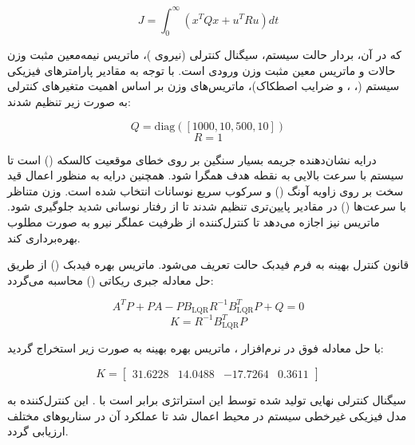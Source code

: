 \begin{equation}
    J = \int_{0}^{\infty} \left( x^T Q x + u^T R u \right) dt
\end{equation}

که در آن،  بردار حالت سیستم،  سیگنال کنترلی (نیروی )،  ماتریس نیمه‌معین مثبت وزن حالات و  ماتریس معین مثبت وزن ورودی است. با توجه به مقادیر پارامترهای فیزیکی سیستم (، ،  و ضرایب اصطکاک)، ماتریس‌های وزن بر اساس اهمیت متغیرهای کنترلی به صورت زیر تنظیم شدند:

\begin{equation}
    Q = \mathrm{diag}([1000, 10, 500, 10])
\end{equation}
\begin{equation}
    R = 1
\end{equation}

درایه  نشان‌دهنده جریمه بسیار سنگین بر روی خطای موقعیت کالسکه () است تا سیستم با سرعت بالایی به نقطه هدف همگرا شود. همچنین درایه  به منظور اعمال قید سخت بر روی زاویه آونگ (\lr{$\theta$}) و سرکوب سریع نوسانات انتخاب شده است. وزن متناظر با سرعت‌ها () در مقادیر پایین‌تری تنظیم شدند تا از رفتار نوسانی شدید جلوگیری شود. ماتریس  نیز اجازه می‌دهد تا کنترل‌کننده از ظرفیت عملگر نیرو به صورت مطلوب بهره‌برداری کند.

قانون کنترل بهینه به فرم فیدبک حالت  تعریف می‌شود. ماتریس بهره فیدبک () از طریق حل معادله جبری ریکاتی () محاسبه می‌گردد:

\begin{equation}
    A^T P + P A - P B_{\mathrm{LQR}} R^{-1} B_{\mathrm{LQR}}^T P + Q = 0
\end{equation}
\begin{equation}
    K = R^{-1} B_{\mathrm{LQR}}^T P
\end{equation}

با حل معادله فوق در نرم‌افزار ، ماتریس بهره بهینه  به صورت زیر استخراج گردید:

\begin{equation}
    K = \begin{bmatrix} 31.6228 & 14.0488 & -17.7264 & 0.3611 \end{bmatrix}
\end{equation}

سیگنال کنترلی نهایی تولید شده توسط این استراتژی برابر است با . این کنترل‌کننده به مدل فیزیکی غیرخطی سیستم در محیط  اعمال شد تا عملکرد آن در سناریوهای مختلف ارزیابی گردد.

